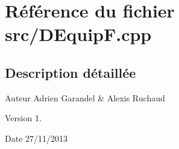 \section{Référence du fichier src/\-D\-Equip\-F.cpp}
\label{_d_equip_f_8cpp}


\subsection{Description détaillée}
\begin{DoxyAuthor}{Auteur}
Adrien Garandel \& Alexis Ruchaud 
\end{DoxyAuthor}
\begin{DoxyVersion}{Version}
1. 
\end{DoxyVersion}
\begin{DoxyDate}{Date}
27/11/2013 
\end{DoxyDate}

